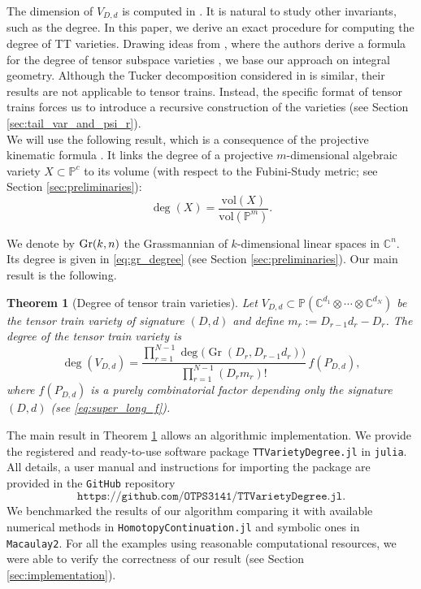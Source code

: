 \documentclass{article}
\newtheorem{theorem}{Theorem}
\theoremstyle{definition}
\DeclareMathOperator{\Gr}{Gr}
\newcommand{\C}{\mathbb{C}}
\newcommand{\vol}{\mathrm{vol}}
\renewcommand{\P}{\mathbb{P}}
\begin{document}
The dimension of $V_{D,d}$ is computed in \cite{Bernardi_2022}. It is natural to study other invariants, such as the degree. In this paper, we derive an exact procedure for computing the degree of TT varieties. Drawing ideas from \cite{Breiding_2024}, where the authors derive a formula for the degree of tensor subspace varieties \cite{landsberg_2012}, we base our approach on integral geometry. Although the Tucker decomposition considered in \cite{Breiding_2024} is similar, their results are not applicable to tensor trains. Instead, the specific format of tensor trains forces us to introduce a recursive construction of the varieties (see Section \ref{sec:tail_var_and_psi_r}).
\\
\noindent
We will use the following result, which is a consequence of the projective kinematic formula \cite{LerarioNotes, howard_1993}. It links the degree of a projective $m$-dimensional algebraic variety $X \subset \P^c$ to its volume (with respect to the Fubini-Study metric; see Section \ref{sec:preliminaries}):
\begin{equation}\label{eq:kinematic_formula}
    \deg(X)
=
\frac{\vol(X)}{\vol(\P^m)}.
\end{equation}

\noindent 
We denote by ${\rm Gr}(k,n)$ the Grassmannian of $k$-dimensional linear spaces in $\C^n$. Its degree is given in \eqref{eq:gr_degree} (see Section \ref{sec:preliminaries}). Our main result is the following.
\begin{theorem}[Degree of tensor train varieties]\label{thm:degree_formula}
Let $V_{D,d}\subset\P\!\left(\C^{d_1}\otimes\cdots\otimes\C^{d_N}\right)$ be the tensor train variety of signature \((D,d)\) and define $m_r:=D_{r-1}d_r-D_r$.
The degree of the tensor train variety is 
\[
\deg(V_{D,d})
=
\frac{
\displaystyle
\prod_{r=1}^{N-1}
\deg\bigl(\Gr(D_r,D_{r-1}d_r)\bigr)
}{
\displaystyle
\prod_{r=1}^{N-1}
(D_rm_r)!
}
\,
f(P_{D,d}),
\]
where $f(P_{D,d})$ is a purely combinatorial factor depending only the signature $(D,d)$ (see \eqref{eq:super_long_f}).
\end{theorem}
The main result in Theorem \ref{thm:degree_formula} allows an algorithmic implementation. We provide the registered and ready-to-use software package \texttt{TTVarietyDegree.jl} in \texttt{julia}. All details, a user manual and instructions for importing the package are provided in the \texttt{GitHub} repository 
\[\texttt{https://github.com/OTPS3141/TTVarietyDegree.jl}.\]
We benchmarked the results of our algorithm comparing it with available numerical methods in \texttt{HomotopyContinuation.jl} and symbolic ones in \texttt{Macaulay2}. For all the examples using reasonable computational resources, we were able to verify the correctness of our result (see Section \ref{sec:implementation}). 
\end{document}
